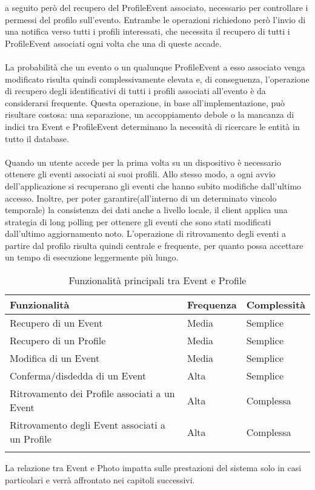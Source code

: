 a seguito però del recupero del ProfileEvent associato,
necessario per controllare i permessi del profilo sull'evento.
Entrambe le operazioni richiedono però l'invio di una notifica verso tutti i profili interessati,
che necessita il recupero di tutti i ProfileEvent associati ogni volta che una di queste accade.\\
\\
La probabilità che un evento o un qualunque ProfileEvent a esso associato
venga modificato risulta quindi complessivamente elevata e, di conseguenza,
l'operazione di recupero degli identificativi di tutti i profili associati all'evento
è da considerarsi frequente.
Questa operazione, in base all'implementazione, può risultare costosa:
una separazione, un accoppiamento debole o la mancanza di indici tra Event e ProfileEvent
determinano la necessità di ricercare le entità in tutto il database.\\
\\
Quando un utente accede per la prima volta su un dispositivo
è necessario ottenere gli eventi associati ai suoi profili.
Allo stesso modo, a ogni avvio dell'applicazione si recuperano gli eventi
che hanno subito modifiche dall'ultimo accesso.
Inoltre, per poter garantire(all'interno di un determinato vincolo temporale)
la consistenza dei dati anche a livello locale,
il client applica una strategia di long polling
per ottenere gli eventi che sono stati modificati dall'ultimo aggiornamento noto.
L'operazione di ritrovamento degli eventi a partire dal profilo risulta quindi centrale e frequente,
per quanto possa accettare un tempo di esecuzione leggermente più lungo. \\

\begin{longtable}{|P{9.5cm}|P{2.5cm}|P{2.5cm}|}
    \hline
    \textbf{Funzionalità}                           & \textbf{Frequenza } & \textbf{Complessità} \\
    \hline
    Recupero di un Event                            & Media               & Semplice             \\
    \hline
    Recupero di un Profile                          & Media               & Semplice             \\
    \hline
    Modifica di un Event                            & Media               & Semplice             \\
    \hline
    Conferma/disdedda di un Event                   & Alta                & Semplice             \\
    \hline
    Ritrovamento dei Profile associati a un Event   & Alta                & Complessa            \\
    \hline
    Ritrovamento degli Event associati a un Profile & Alta                & Complessa            \\
    \hline
    \caption{Funzionalità principali tra Event e Profile}
\end{longtable}

La relazione tra Event e Photo impatta sulle prestazioni del sistema solo in casi particolari e
verrà affrontato nei capitoli successivi.
\clearpage